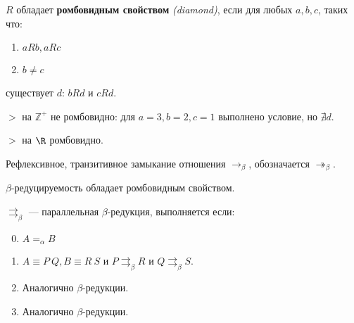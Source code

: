 \begin{definition}
    \(R\) обладает \textbf{ромбовидным свойством} \textit{(diamond)}, если для любых \(a,b,c\), таких что:
    \begin{enumerate}
        \item \(aRb, aRc\)
        \item \(b \neq c\)
    \end{enumerate}
    существует \(d\): \(bRd\) и \(cRd\).

    \begin{center}
    \end{center}
\end{definition}

\begin{example}
    \( > \) на \(\mathbb{Z}^+\) не ромбовидно: для \(a = 3, b = 2, c = 1\) выполнено условие, но \(\nexists d\).

    \( > \) на \(\R\) ромбовидно.
\end{example}

\begin{definition}
    Рефлексивное, транзитивное замыкание отношения \( \to_\beta\), обозначается \( \twoheadrightarrow_\beta\).
\end{definition}

\begin{theorem}
    \label{чр}
    \(\beta\)-редуцируемость обладает ромбовидным свойством.
\end{theorem}

\begin{definition}
    \(\rightrightarrows_\beta\) --- параллельная \(\beta\)-редукция, выполняется если:
    \begin{enumerate}
        \setcounter{enumi}{-1}
        \item \(A =_\alpha B\)
        \item \(A \equiv P\ Q, B \equiv R\ S\) и \(P \rightrightarrows_\beta R\) и \(Q \rightrightarrows_\beta S\).
        \item Аналогично \(\beta\)-редукции.
        \item Аналогично \(\beta\)-редукции.
    \end{enumerate}
\end{definition}

